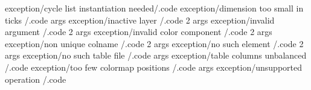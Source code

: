 exception/cycle list instantiation needed/.code
exception/dimension too small in ticks   /.code args
exception/inactive layer                 /.code 2 args
exception/invalid argument               /.code 2 args
exception/invalid color component        /.code 2 args
exception/non unique colname             /.code 2 args
exception/no such element                /.code 2 args
exception/no such table file             /.code args
exception/table columns unbalanced       /.code
exception/too few colormap positions     /.code args
exception/unsupported operation          /.code

